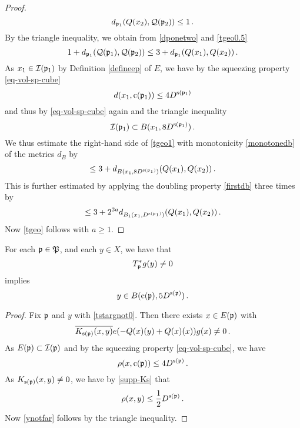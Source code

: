 {\begin{proof}
\begin{equation}\label{tgeo0.5}
    d_{{\mathfrak p}_1}({Q}(x_2), {\mathcal{Q}}({\mathfrak p}_2)) \le 1\,.
\end{equation}
By the triangle inequality, we obtain from \eqref{dponetwo} and
\eqref{tgeo0.5}
\begin{equation}\label{tgeo1}
     1+d_{{\mathfrak p}_1}({\mathcal{Q}}({\mathfrak p}_1), {\mathcal{Q}}({\mathfrak p}_2))\le  3 +d_{{\mathfrak p}_1}({Q}(x_1), {Q}(x_2))\, .
\end{equation}
As $x_1\in {\mathcal{I}}({\mathfrak p}_1)$ by Definition \eqref{defineep} of $E$, we have by the squeezing property  \eqref{eq-vol-sp-cube}
\begin{equation}
    d(x_1,{\mathrm{c}}({\mathfrak p}_1))\le 4D^{{\mathrm{s}}({\mathfrak p}_1)}
\end{equation}
and thus by \eqref{eq-vol-sp-cube} again and the triangle inequality
\begin{equation}
    {\mathcal{I}}({\mathfrak p}_1)\subset B(x_1,8D^{{\mathrm{s}}({\mathfrak p}_1)})\, .
\end{equation}
We thus estimate the right-hand side of \eqref{tgeo1} with monotonicity \eqref{monotonedb} of the metrics $d_B$ by
\begin{equation}\label{tgeo1.5}
    \le  3+d_{B(x_1,8D^{{\mathrm{s}}({\mathfrak p}_1)})}({Q}(x_1), {Q}(x_2))\, .
\end{equation}
This is further estimated by applying the doubling property  \eqref{firstdb} three times by
\begin{equation}\label{tgeo2}
    \le  3+2^{3a}d_{B_1(x_1, D^{{\mathrm{s}}({\mathfrak p}_1)})}({Q}(x_1), {Q}(x_2))\, .
\end{equation}
Now \eqref{tgeo} follows with $a\ge 1$.
\end{proof}




\begin{lemma}\label{tile-range-support}
    For each  ${\mathfrak p}\in {\mathfrak P}$, and each $y\in X$, we have that
\begin{equation}\label{tstargnot0}
     T_{{\mathfrak p}}^* g(y)\neq 0
\end{equation}
   implies
\begin{equation}\label{ynotfar}
    y\in  B({\mathrm{c}}({\mathfrak p}),5D^{{\mathrm{s}}({\mathfrak p})})\, .
\end{equation}
\end{lemma}
\begin{proof}
Fix ${\mathfrak p}$ and $y$ with \eqref{tstargnot0}.
Then there exists $x\in E({\mathfrak p})$ with
\begin{equation}
   \overline{K_{{\mathrm{s}}({\mathfrak p})}(x,y)}e(-{Q}(x)(y)
    +{Q}(x)(x))g(x) \neq 0\, .
\end{equation}
As $E({\mathfrak p})\subset {\mathcal{I}}({\mathfrak p})$ and by the squeezing property
\eqref{eq-vol-sp-cube}, we have
\begin{equation}
    \rho(x,{\mathrm{c}}({\mathfrak p}))\le 4D^{{\mathrm{s}}({\mathfrak p})}\, .
\end{equation}
As $K_{{\mathrm{s}}({\mathfrak p})}(x,y)\neq 0$, we have by  \eqref{supp-Ks}
that
\begin{equation}
\rho(x,y)\le \frac 12 D^{{\mathrm{s}}({\mathfrak p})}\, .
\end{equation}
Now \eqref{ynotfar} follows by the triangle inequality.
\end{proof}


}
